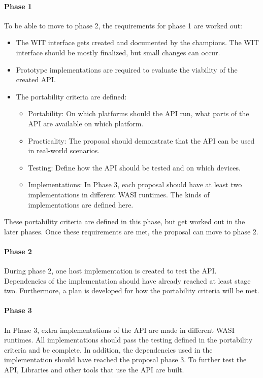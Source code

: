 \paragraph{Phase 1}
To be able to move to phase 2, the requirements for phase 1 are worked out:
\begin{itemize}
\item The WIT interface gets created and documented by the champions. The WIT interface should be mostly finalized, but small changes can occur.
\item Prototype implementations are required to evaluate the viability of the created API.
\item The portability criteria are defined:
\begin{itemize}
\item Portability: On which platforms should the API run, what parts of the API are available on which platform.
\item Practicality: The proposal should demonstrate that the API can be used in real-world scenarios.
\item Testing: Define how the API should be tested and on which devices.
\item Implementations: In Phase 3, each proposal should have at least two implementations in different WASI runtimes. The kinds of implementations are defined here.
\end{itemize}
\end{itemize}

These portability criteria are defined in this phase, but get worked out in the later phases.
Once these requirements are met, the proposal can move to phase 2.

\paragraph{Phase 2}
During phase 2, one host implementation is created to test the API. Dependencies of the implementation should have already reached at least stage two.
Furthermore, a plan is developed for how the portability criteria will be met.

\paragraph{Phase 3}
In Phase 3, extra implementations of the API are made in different WASI runtimes. All implementations should pass the testing defined in the portability criteria and be complete. In addition, the dependencies used in the implementation should have reached the proposal phase 3. To further test the API, Libraries and other tools that use the API are built.

